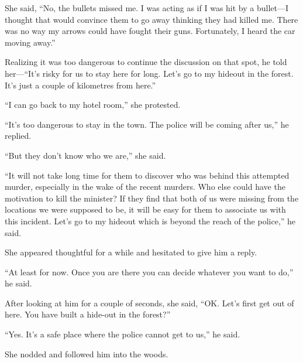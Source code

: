 She said, “No, the bullets missed me. I was acting as if I was hit by a bullet—I
thought that would convince them to go away thinking they had killed me. There
was no way my arrows could have fought their guns. Fortunately, I heard the car
moving away.”

Realizing it was too dangerous to continue the discussion on that spot, he told
her—“It's risky for us to stay here for long. Let's go to my hideout in the
forest. It's just a couple of kilometres from here.”

“I can go back to my hotel room,” she protested.

“It's too dangerous to stay in the town. The police will be coming after us,” he
replied.

“But they don't know who we are,” she said.

“It will not take long time for them to discover who was behind this attempted
murder, especially in the wake of the recent murders. Who else could have the
motivation to kill the minister? If they find that both of us were missing from
the locations we were supposed to be, it will be easy for them to associate us
with this incident. Let's go to my hideout which is beyond the reach of the
police,” he said.

She appeared thoughtful for a while and hesitated to give him a reply.

“At least for now. Once you are there you can decide whatever you want to do,”
he said.

After looking at him for a couple of seconds, she said, “OK. Let's first get out
of here. You have built a hide-out in the forest?”

“Yes. It's a safe place where the police cannot get to us,” he said.

She nodded and followed him into the woods.